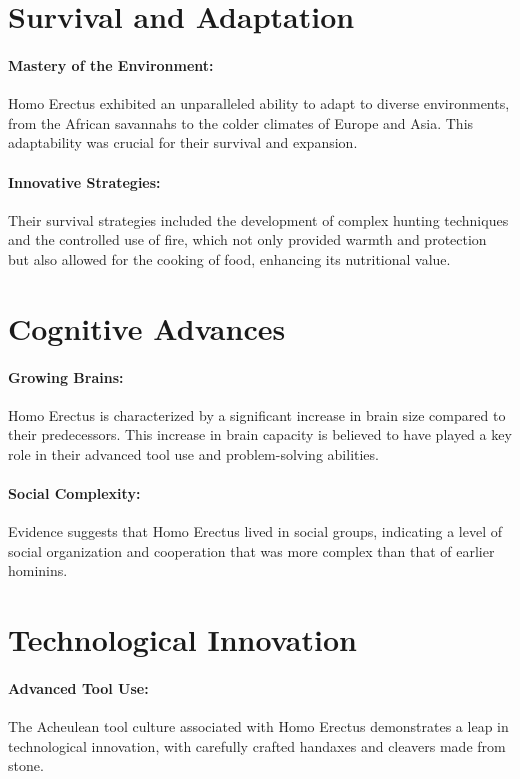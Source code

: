 \documentclass[a4paper,12pt]{book}
\begin{document}
\section*{Survival and Adaptation}

\paragraph{Mastery of the Environment:}
Homo Erectus exhibited an unparalleled ability to adapt to diverse environments, from the African savannahs to the colder climates of Europe and Asia. This adaptability was crucial for their survival and expansion.

\paragraph{Innovative Strategies:}
Their survival strategies included the development of complex hunting techniques and the controlled use of fire, which not only provided warmth and protection but also allowed for the cooking of food, enhancing its nutritional value.

\section*{Cognitive Advances}

\paragraph{Growing Brains:}
Homo Erectus is characterized by a significant increase in brain size compared to their predecessors. This increase in brain capacity is believed to have played a key role in their advanced tool use and problem-solving abilities.

\paragraph{Social Complexity:}
Evidence suggests that Homo Erectus lived in social groups, indicating a level of social organization and cooperation that was more complex than that of earlier hominins.

\section*{Technological Innovation}

\paragraph{Advanced Tool Use:}
The Acheulean tool culture associated with Homo Erectus demonstrates a leap in technological innovation, with carefully crafted handaxes and cleavers made from stone.
\end{document}
